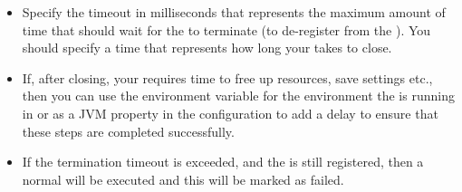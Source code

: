 \begin{itemize}
\item Specify the timeout in milliseconds that represents the maximum amount of time that \app{} should wait for the \gdaut{} to terminate (to de-register from the \gdagent{}). You should specify a time that represents how long your \gdaut{} takes to close.
\item If, after closing, your \gdaut{} requires time to free up resources, save settings etc., then you can use the environment variable   for the environment the \gdagent{} is running in  or as a JVM property in the \gdaut{} configuration  to add a delay to ensure that these steps are completed successfully. 
\item If the termination timeout is exceeded, and the \gdaut{} is still registered, then a normal  \gdaut{} will be executed and this \gdstep{} will be marked as failed.  
\end{itemize}


